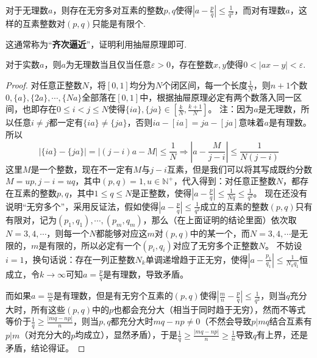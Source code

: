 \documentclass[../../main.tex]{subfiles}%
\begin{document}
\begin{theorem}[狄利克雷定理]\label{theorem:狄利克雷定理}
对于无理数\(a\)，则存在无穷多对互素的整数\(p,q\)使得\(\left|a - \frac{p}{q}\right|\leqslant \frac{1}{q^2}\)，而对有理数\(a\)，这样的互素整数对\((p,q)\)只能是有限个.
\end{theorem}
\begin{note}
这通常称为“\textbf{齐次逼近}”，证明利用抽屉原理即可.
\end{note}

\begin{corollary}
对于实数\(a\)，则\(a\)为无理数当且仅当任意\(\varepsilon>0\)，存在整数\(x,y\)使得\(0 < |ax - y| < \varepsilon\).
\end{corollary}
\begin{proof}

对任意正整数\(N\)，将\([0,1]\)均分为\(N\)个闭区间，每一个长度\(\frac{1}{N}\)，则\(n + 1\)个数\(0,\{a\},\{2a\},\cdots,\{Na\}\)全部落在\([0,1]\)中，根据抽屉原理必定有两个数落入同一区间，也即存在\(0\leqslant  i < j\leqslant  N\)使得\(\{ia\},\{ja\}\in\left[\frac{k}{N},\frac{k + 1}{N}\right]\)。
注：因为\(a\)是无理数，所以任意\(i\neq j\)都一定有\(\{ia\}\neq\{ja\}\)，否则\(ia - [ia]=ja - [ja]\)意味着\(a\)是有理数。
所以
\[|\{ia\} - \{ja\}|=|(j - i)a - M|\leqslant \frac{1}{N}\Rightarrow\left|a - \frac{M}{j - i}\right|\leqslant \frac{1}{N(j - i)}\]
这里\(M\)是一个整数，现在不一定有\(M\)与\(j - i\)互素，但是我们可以将其写成既约分数\(M = up,j - i = uq\)，其中\((p,q)=1,u\in\mathbb{N}^+\)，代入得到：对任意正整数\(N\)，都存在互素的整数\(p,q\)，其中\(1\leqslant  q\leqslant  N\)是正整数，使得\(\left|a - \frac{p}{q}\right|\leqslant \frac{1}{Nq}\leqslant \frac{1}{q^2}\)。
现在还没有说明“无穷多个”，采用反证法，假如使得\(\left|a - \frac{p}{q}\right|\leqslant \frac{1}{q^2}\)成立的互素的整数\((p,q)\)只有有限对，记为\((p_1,q_1),\cdots,(p_m,q_m)\)，那么（在上面证明的结论里面）依次取\(N = 3,4,\cdots\)，则每一个\(N\)都能够对应这\(m\)对\((p,q)\)中的某一个，而\(N = 3,4,\cdots\)是无限的，\(m\)是有限的，所以必定有一个\((p_i,q_i)\)对应了无穷多个正整数\(N\)。
不妨设\(i = 1\)，换句话说：存在一列正整数\(N_k\)单调递增趋于正无穷，使得\(\left|a - \frac{p_1}{q_1}\right|\leqslant \frac{1}{N_kq_1}\)恒成立，令\(k\to\infty\)可知\(a = \frac{p}{q}\)是有理数，导致矛盾。

而如果\(a=\frac{m}{n}\)是有理数，但是有无穷个互素的\((p,q)\)使得\(\left|\frac{m}{n}-\frac{p}{q}\right|\leqslant \frac{1}{q^2}\)，则当\(q\)充分大时，所有这些\((p,q)\)中的\(p\)也都会充分大（相当于同时趋于无穷），然而不等式等价于\(\frac{1}{q}\geqslant \frac{|mq - np|}{n}\)，则当\(p,q\)都充分大时\(mq - np\neq0\)（不然会导致\(p|mq\)结合互素有\(p|m\)（对充分大的\(p\)均成立），显然矛盾），于是\(\frac{1}{q}\geqslant \frac{|mq - np|}{n}\geqslant \frac{1}{n}\)导致\(q\)有上界，还是矛盾，结论得证。

\end{proof}
\end{document}
